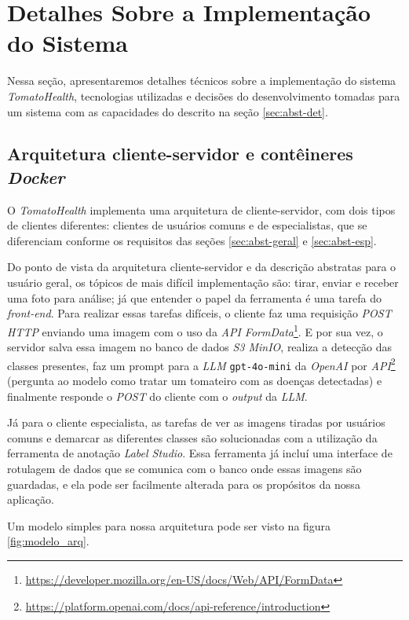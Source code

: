 \chapter{Detalhes Sobre a Implementação do Sistema} \label{sec:implementacao_sistema}

Nessa seção, apresentaremos detalhes técnicos sobre a implementação do sistema \textit{TomatoHealth}, tecnologias utilizadas e decisões do desenvolvimento tomadas para um sistema com as capacidades do descrito na seção \ref{sec:abst-det}.

\section{Arquitetura cliente-servidor e contêineres \emph{Docker}}

O \emph{TomatoHealth} implementa uma arquitetura de cliente-servidor, com dois tipos de clientes diferentes: clientes de usuários comuns e de especialistas, que se diferenciam conforme os requisitos das seções \ref{sec:abst-geral} e \ref{sec:abst-esp}.

Do ponto de vista da arquitetura cliente-servidor e da descrição abstratas para o usuário geral, os tópicos de mais difícil implementação são: tirar, enviar e receber uma foto para análise; já que entender o papel da ferramenta é uma tarefa do \emph{front-end}. Para realizar essas tarefas difíceis, o cliente faz uma requisição \emph{POST HTTP} enviando uma imagem com o uso da \emph{API FormData}\footnote{\url{https://developer.mozilla.org/en-US/docs/Web/API/FormData}}. E por sua vez, o servidor salva essa imagem no banco de dados \emph{S3 MinIO}, realiza a detecção das classes presentes, faz um prompt para a \emph{LLM} \texttt{gpt-4o-mini} da \emph{OpenAI} por \emph{API}\footnote{\url{https://platform.openai.com/docs/api-reference/introduction}} (pergunta ao modelo como tratar um tomateiro com as doenças detectadas) e finalmente responde o \emph{POST} do cliente com o \emph{output} da \emph{LLM}.

Já para o cliente especialista, as tarefas de ver as imagens tiradas por usuários comuns e demarcar as diferentes classes são solucionadas com a utilização da ferramenta de anotação \emph{Label Studio}. Essa ferramenta já incluí uma interface de rotulagem de dados que se comunica com o banco onde essas imagens são guardadas, e ela pode ser facilmente alterada para os propósitos da nossa aplicação.

Um modelo simples para nossa arquitetura pode ser visto na figura \ref{fig:modelo_arq}.

